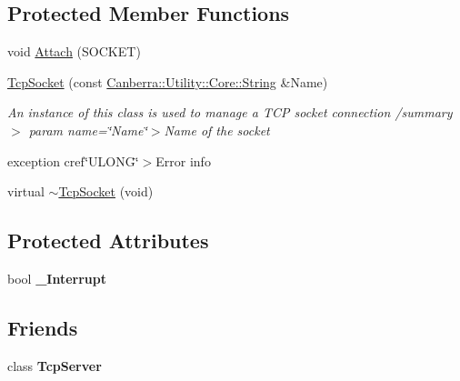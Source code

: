 \subsection*{Protected Member Functions}
\begin{DoxyCompactItemize}
\item 
void \hyperlink{class_canberra_1_1_utility_1_1_network_1_1_tcp_socket_a2dccf64827a818f8c6a778c9cc846929_a2dccf64827a818f8c6a778c9cc846929}{Attach} (S\+O\+C\+K\+ET)
\item 
\mbox{\label{class_canberra_1_1_utility_1_1_network_1_1_tcp_socket_ac742e73beb53101dbc4aad1559ed7c51}} 
\hyperlink{class_canberra_1_1_utility_1_1_network_1_1_tcp_socket_ac742e73beb53101dbc4aad1559ed7c51}{Tcp\+Socket} (const \hyperlink{class_canberra_1_1_utility_1_1_core_1_1_string}{Canberra\+::\+Utility\+::\+Core\+::\+String} \&Name)
\begin{DoxyCompactList}\small\item\em An instance of this class is used to manage a T\+CP socket connection /summary$>$ param name=\char`\"{}\+Name\char`\"{}$>$Name of the socket

exception cref\char`\"{}\+U\+L\+O\+N\+G\char`\"{}$>$Error info\end{DoxyCompactList}\item 
virtual \hyperlink{class_canberra_1_1_utility_1_1_network_1_1_tcp_socket_a25740725cab9a4c71c8e6de3b8ef7f54_a25740725cab9a4c71c8e6de3b8ef7f54}{$\sim$\+Tcp\+Socket} (void)
\end{DoxyCompactItemize}
\subsection*{Protected Attributes}
\begin{DoxyCompactItemize}
\item 
\mbox{\label{class_canberra_1_1_utility_1_1_network_1_1_tcp_socket_a15148ccf26b6dc892d49195bc80c6a51}} 
bool {\bfseries \+\_\+\+Interrupt}
\end{DoxyCompactItemize}
\subsection*{Friends}
\begin{DoxyCompactItemize}
\item 
\mbox{\label{class_canberra_1_1_utility_1_1_network_1_1_tcp_socket_a3ecf3132e8c4bf890c07853cfab7619c}} 
class {\bfseries Tcp\+Server}
\end{DoxyCompactItemize}


